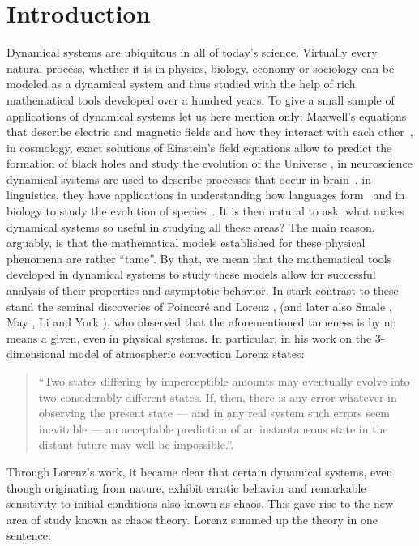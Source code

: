 \chapter{Introduction}

Dynamical systems are ubiquitous in all of today's science.
%
Virtually every natural process, whether it is in physics, biology, economy or sociology can be modeled as a dynamical system and thus studied with the help of rich mathematical tools developed over a hundred years.
%
To give a small sample of applications of dynamical systems let us here mention only: Maxwell's equations that describe electric and magnetic fields and how they interact with each other~\cite{Maxwell1865}, in cosmology, exact solutions of Einstein's field equations allow to predict the formation of black holes and study the evolution of the Universe \cite{Bahamonde18}, 
 in neuroscience dynamical systems are used to describe processes that occur in brain~\cite{Izhikevich07}, in linguistics, they have applications in understanding how languages form~\cite{Elman95} and in biology to study the evolution of species~\cite{MDL96}.
%
It is then natural to ask: what makes dynamical systems so useful in studying all these areas? 
The main reason, arguably, is that the mathematical models established for these physical phenomena are rather ``tame''. By that, we mean that the mathematical tools developed in dynamical systems to study these models allow for successful analysis of their properties and asymptotic behavior. 
In stark contrast to these stand the seminal discoveries of Poincar\'{e}  \cite{Poincare} and Lorenz \cite{Lorenz63}, (and later also  Smale \cite{Smale67},   May \cite{May76},  Li and York \cite{LY75}), who observed that the aforementioned tameness is by no means a given, even in physical systems. 
%
In particular, in his work on the $3$-dimensional model of atmospheric convection  Lorenz \cite{Lorenz63} states:
\begin{quote} 
\centering 
``Two states differing by imperceptible amounts may eventually evolve into two considerably different states. If, then, there is any error whatever in observing the present state — and in any real system such errors seem inevitable — an acceptable prediction of an instantaneous state in the distant future may well be impossible.''.
\end{quote}
%
Through Lorenz's work, it became clear that certain dynamical systems, even though originating from nature, exhibit erratic behavior and remarkable sensitivity to initial conditions also known as chaos. This gave rise to the new area of study known as chaos theory. Lorenz summed up the theory in one sentence:

